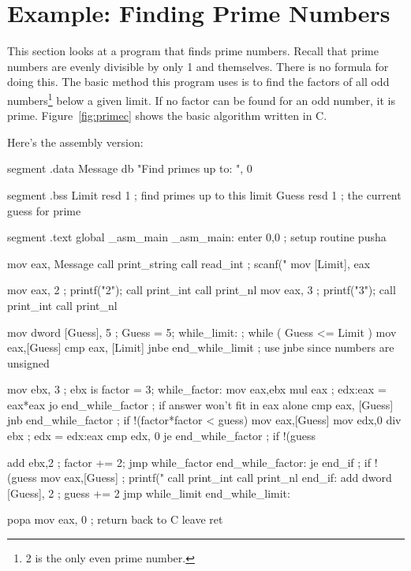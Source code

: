 \section{Example: Finding Prime Numbers}
This section looks at a program that finds prime numbers. Recall that
prime numbers are evenly divisible by only 1 and themselves. There is
no formula for doing this. The basic method this program uses is to
find the factors of all odd numbers\footnote{2 is the only even prime
number.} below a given limit. If no factor can be found for an odd
number, it is prime.  Figure~\ref{fig:primec} shows the basic
algorithm written in C.

Here's the assembly version:
\begin{AsmCodeListing}[label=prime.asm]
segment .data
Message         db      "Find primes up to: ", 0

segment .bss
Limit           resd    1               ; find primes up to this limit
Guess           resd    1               ; the current guess for prime

segment .text
        global  _asm_main
_asm_main:
        enter   0,0               ; setup routine
        pusha

        mov     eax, Message
        call    print_string
        call    read_int             ; scanf("%
        mov     [Limit], eax

        mov     eax, 2               ; printf("2\n");
        call    print_int
        call    print_nl
        mov     eax, 3               ; printf("3\n");
        call    print_int
        call    print_nl

        mov     dword [Guess], 5     ; Guess = 5;
while_limit:                         ; while ( Guess <= Limit )
        mov     eax,[Guess]
        cmp     eax, [Limit]
        jnbe    end_while_limit      ; use jnbe since numbers are unsigned

        mov     ebx, 3               ; ebx is factor = 3;
while_factor:
        mov     eax,ebx
        mul     eax                  ; edx:eax = eax*eax
        jo      end_while_factor     ; if answer won't fit in eax alone
        cmp     eax, [Guess]
        jnb     end_while_factor     ; if !(factor*factor < guess)
        mov     eax,[Guess]
        mov     edx,0
        div     ebx                  ; edx = edx:eax %
        cmp     edx, 0
        je      end_while_factor     ; if !(guess %

        add     ebx,2                ; factor += 2;
        jmp     while_factor
end_while_factor:
        je      end_if               ; if !(guess %
        mov     eax,[Guess]          ; printf("%
        call    print_int
        call    print_nl
end_if:
        add     dword [Guess], 2     ; guess += 2
        jmp     while_limit
end_while_limit:

        popa
        mov     eax, 0            ; return back to C
        leave                     
        ret
\end{AsmCodeListing}
